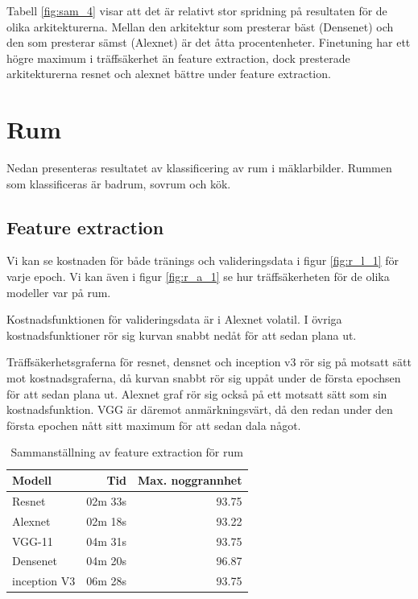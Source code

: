 \documentclass[]{kththesis}
\begin{document}
Tabell \ref{fig:sam_4} visar att det är relativt stor spridning på resultaten för de olika arkitekturerna.
Mellan den arkitektur som presterar bäst (Densenet) och den som presterar sämst (Alexnet) är det åtta procentenheter.
Finetuning har ett högre maximum i träffsäkerhet än feature extraction, dock presterade arkitekturerna resnet och alexnet bättre under feature extraction.

\section{Rum}
Nedan presenteras resultatet av klassificering av rum i mäklarbilder. 
Rummen som klassificeras är badrum, sovrum och kök.


\subsection{Feature extraction}
Vi kan se kostnaden för både tränings och valideringsdata i figur \ref{fig:r_l_1} för varje epoch. Vi kan även  i figur \ref{fig:r_a_1} se hur träffsäkerheten för de olika modeller var på rum.

Kostnadsfunktionen för valideringsdata är i Alexnet volatil. 
I övriga kostnadsfunktioner rör sig kurvan snabbt nedåt för att sedan plana ut.

Träffsäkerhetsgraferna för resnet, densnet och inception v3 rör sig på motsatt sätt mot kostnadsgraferna, då kurvan snabbt rör sig uppåt under de första epochsen för att sedan plana ut.
Alexnet graf rör sig också på ett motsatt sätt som sin kostnadsfunktion. 
VGG är däremot anmärkningsvärt, då den redan under den första epochen nått sitt maximum för att sedan dala något.


\begin{table}[!htbp]
  \centering
  \begin{tabular}{|l|r|r|}
    Modell & Tid & Max. noggrannhet \\ 
    \hline
    Resnet       & 02m 33s & 93.75 \\
    Alexnet      & 02m 18s & 93.22 \\
    VGG-11       & 04m 31s & 93.75 \\
    Densenet     & 04m 20s & 96.87 \\
    inception V3 & 06m 28s & 93.75 \\
  \end{tabular}
  \caption{Sammanställning av feature extraction för rum}
  \label{fig:sam_5}
\end{table}
\end{document}
